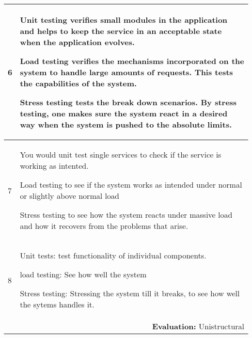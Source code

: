 \begin{longtable}{|p{0.3cm}|p{14.7cm}|}
6 & Unit testing verifies small modules in the application and helps to keep the service in an acceptable state when the application evolves.

\noindent Load testing verifies the mechanisms incorporated on the system to handle large amounts of requests. This tests the capabilities of the system.

\noindent Stress testing tests the break down scenarios. By stress testing, one makes sure the system react in a desired way when the system is pushed to the absolute limits. \\ \hline

7 & You would unit test single services to check if the service is working as intented.

\noindent Load testing to see if the system works as intended under normal or slightly above normal load

\noindent Stress testing to see how the system reacts under massive load and how it recovers from the problems that arise. \\ \hline

8 & Unit tests: test functionality of individual components.

\noindent load testing: See how well the system 

\noindent Stress testing: Stressing the system till it breaks, to see how well the sytems handles it. \\ \hline

\multicolumn{2}{r}{\textbf{Evaluation:} Unistructural} \\ 
\end{longtable}
\normalsize



